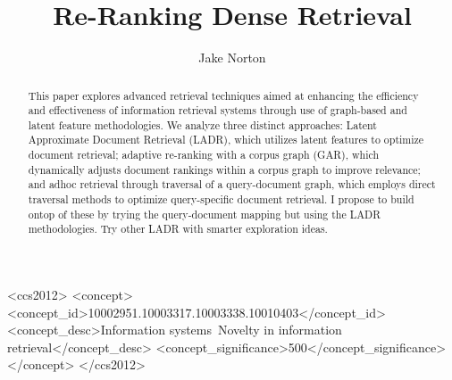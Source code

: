 \documentclass[sigconf,authorversion,nonacm]{acmart}
\begin{document}
\title{Re-Ranking Dense Retrieval}
\author{Jake Norton}



\begin{abstract}
	This paper explores advanced retrieval techniques aimed at enhancing the efficiency
	and effectiveness of information retrieval systems through use of graph-based and
	latent feature methodologies. We analyze three distinct approaches: Latent Approximate Document
	Retrieval (LADR), which utilizes latent features to optimize document retrieval; adaptive
	re-ranking with a corpus graph (GAR), which dynamically adjusts document rankings within a
	corpus graph to improve relevance; and adhoc retrieval through traversal of a query-document
	graph, which employs direct traversal methods to optimize query-specific document retrieval. I
	propose to build ontop of these by trying the query-document mapping but using the LADR
	methodologies. Try other LADR with smarter exploration ideas.


\end{abstract}


\begin{CCSXML} <ccs2012> <concept> <concept_id>10002951.10003317.10003338.10010403</concept_id>
	<concept_desc>Information systems~Novelty in information retrieval</concept_desc>
	<concept_significance>500</concept_significance> </concept> </ccs2012>
\end{CCSXML}


\maketitle
\end{document}
